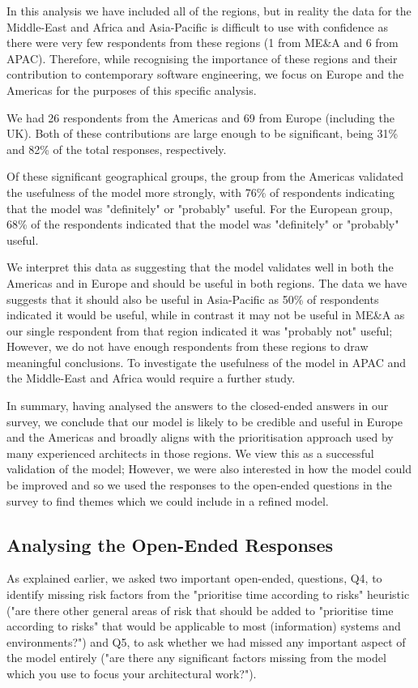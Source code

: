 In this analysis we have included all of the regions, but in reality the data for the Middle-East and Africa and Asia-Pacific is difficult to use with confidence as there were very few respondents from these regions (1 from ME\&A and 6 from APAC).  Therefore, while recognising the importance of these regions and their contribution to contemporary software engineering, we focus on Europe and the Americas for the purposes of this specific analysis.

We had 26 respondents from the Americas and 69 from Europe (including the UK).  Both of these contributions are large enough to be significant, being 31\% and 82\% of the total responses, respectively.

Of these significant geographical groups, the group from the Americas validated the usefulness of the model more strongly, with 76\% of respondents indicating that the model was "definitely" or "probably" useful.  For the European group, 68\% of the respondents indicated that the model was "definitely" or "probably" useful.

We interpret this data as suggesting that the model validates well in both the Americas and in Europe and should be useful in both regions.  The data we have suggests that it should also be useful in Asia-Pacific as 50\% of respondents indicated it would be useful, while in contrast it may not be useful in ME\&A as our single respondent from that region indicated it was "probably not" useful; However, we do not have enough respondents from these regions to draw meaningful conclusions.  To investigate the usefulness of the model in APAC and the Middle-East and Africa would require a further study.

In summary, having analysed the answers to the closed-ended answers in our survey, we conclude that our model is likely to be credible and useful in Europe and the Americas and broadly aligns with the prioritisation approach used by many experienced architects in those regions.
We view this as a successful validation of the model; However, we were also interested in how the model could be improved and so we used the responses to the open-ended questions in the survey to find themes which we could include in a refined model.

\subsection{Analysing the Open-Ended Responses}
\label{sec:openended}

As explained earlier, we asked two important open-ended, questions, Q4, to identify missing risk factors from the "prioritise time according to risks" heuristic ("are there other general areas of risk that should be added to "prioritise time according to risks" that would be applicable to most (information) systems and environments?") and Q5, to ask whether we had missed any important aspect of the model entirely ("are there any significant factors missing from the model which you use to focus your architectural work?").

